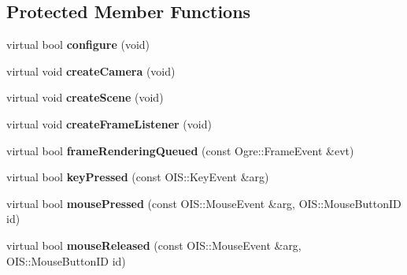 \subsection*{Protected Member Functions}
\begin{DoxyCompactItemize}
\item 
\hypertarget{classTutorialApplication_aec0e5d9fe646e99f75fecd1f344d9462}{virtual bool {\bfseries configure} (void)}\label{classTutorialApplication_aec0e5d9fe646e99f75fecd1f344d9462}

\item 
\hypertarget{classTutorialApplication_a967133a33af64f5b393a330ea3cfe9ef}{virtual void {\bfseries create\-Camera} (void)}\label{classTutorialApplication_a967133a33af64f5b393a330ea3cfe9ef}

\item 
\hypertarget{classTutorialApplication_a84ca595bc8aebddbf8f270a6ca74a8de}{virtual void {\bfseries create\-Scene} (void)}\label{classTutorialApplication_a84ca595bc8aebddbf8f270a6ca74a8de}

\item 
\hypertarget{classTutorialApplication_a5984b8082148bcbd79f39d770b6e645d}{virtual void {\bfseries create\-Frame\-Listener} (void)}\label{classTutorialApplication_a5984b8082148bcbd79f39d770b6e645d}

\item 
\hypertarget{classTutorialApplication_a8673d7cdc31fc5491ee6217f35953804}{virtual bool {\bfseries frame\-Rendering\-Queued} (const Ogre\-::\-Frame\-Event \&evt)}\label{classTutorialApplication_a8673d7cdc31fc5491ee6217f35953804}

\item 
\hypertarget{classTutorialApplication_a34c0589ae0eb179f9a0641a1d755dffe}{virtual bool {\bfseries key\-Pressed} (const O\-I\-S\-::\-Key\-Event \&arg)}\label{classTutorialApplication_a34c0589ae0eb179f9a0641a1d755dffe}

\item 
\hypertarget{classTutorialApplication_aa86a0b685816f802b3b213c0e9aca33a}{virtual bool {\bfseries mouse\-Pressed} (const O\-I\-S\-::\-Mouse\-Event \&arg, O\-I\-S\-::\-Mouse\-Button\-I\-D id)}\label{classTutorialApplication_aa86a0b685816f802b3b213c0e9aca33a}

\item 
\hypertarget{classTutorialApplication_a19a6217c0c0e7fd5a9640919479999ec}{virtual bool {\bfseries mouse\-Released} (const O\-I\-S\-::\-Mouse\-Event \&arg, O\-I\-S\-::\-Mouse\-Button\-I\-D id)}\label{classTutorialApplication_a19a6217c0c0e7fd5a9640919479999ec}


\end{DoxyCompactItemize}
